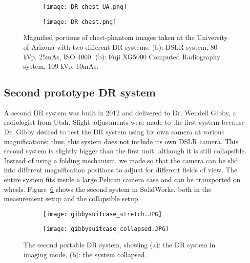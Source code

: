 \begin{figure}[h]
\centering
	\begin{subfigure}[b]{0.45\linewidth}
	\centering
	\texttt{[image: DR\_chest\_UA.png]}
	\caption{}
	\label{fig:DR_chest_film}
	\end{subfigure}
	\hspace{1 cm}
	\begin{subfigure}[b]{0.45\linewidth}
	\texttt{[image: DR\_chest.png]}
	\caption{}
	\label{fig:DR_chest}
	\end{subfigure}
\caption{Magnified portions of chest-phantom images taken at the University of Arizona with two different DR systems. (b): DSLR system, 80 kVp, 25mAs, ISO 4000. (b): Fuji XG5000 Computed Radiography system, 109 kVp, 10mAs.}
\label{fig:DR_chest_both}
\end{figure}

\subsection{Second prototype DR system}
A second DR system was built in 2012 and delivered to Dr. Wendell Gibby, a radiologist from Utah.  Slight adjustments were made to the first system because Dr. Gibby desired to test the DR system using his own camera at various magnifications; thus, this system does not include its own DSLR camera.  This second system is slightly bigger than the first unit, although it is still collapsible.  Instead of using a folding mechanism, we made so that the camera can be slid into different magnification positions to adjust for different fields of view.  The entire system fits inside a large Pelican camera case and can be transported on wheels.  Figure~\ref{fig:DR2} shows the second system in SolidWorks, both in the measurement setup and the collapsible setup.

\begin{figure}[h]
	\begin{subfigure}[b]{0.45\linewidth}
	\centering
	\texttt{[image: gibbysuitcase\_stretch.JPG]}
	\caption{}
	\label{DR2stretched}
	\end{subfigure}
\hspace{0.2cm}
	\begin{subfigure}[b]{0.45\linewidth}
	\centering
	\texttt{[image: gibbysuitcase\_collapsed.JPG]}
	\caption{}
	\label{fig:DR2collapsed}
	\end{subfigure}
\caption{The second portable DR system, showing (a): the DR system in imaging mode, (b): the system collapsed.}
\label{fig:DR2}	
\end{figure}


